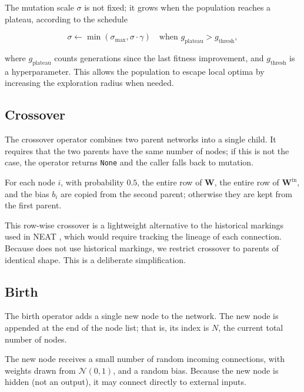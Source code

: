 The mutation scale $\sigma$ is not fixed; it grows when the population
reaches a plateau, according to the schedule

\begin{equation}
  \sigma \gets \min(\sigma_{\max}, \sigma \cdot \gamma)
  \quad \text{when } g_{\text{plateau}} > g_{\text{thresh}},
  \label{eq:method-sigma-adaptation}
\end{equation}

where $g_{\text{plateau}}$ counts generations since the last fitness
improvement, and $g_{\text{thresh}}$ is a hyperparameter. This allows
the population to escape local optima by increasing the exploration
radius when needed.

\subsection{Crossover}
\label{sec:method-crossover}

The crossover operator combines two parent networks into a single
child. It requires that the two parents have the same number of nodes;
if this is not the case, the operator returns \texttt{None} and the
caller falls back to mutation.

For each node $i$, with probability $0.5$, the entire row of
$\mathbf{W}$, the entire row of $\mathbf{W}^{\text{in}}$, and the bias
$b_i$ are copied from the second parent; otherwise they are kept from
the first parent.

This row-wise crossover is a lightweight alternative to the historical
markings used in NEAT \citep{stanley2002evolving}, which would require
tracking the lineage of each connection. Because \modnet{} does not use
historical markings, we restrict crossover to parents of identical
shape. This is a deliberate simplification.

\subsection{Birth}
\label{sec:method-birth}

The birth operator adds a single new node to the network. The new node
is appended at the end of the node list; that is, its index is $N$, the
current total number of nodes.

The new node receives a small number of random incoming connections,
with weights drawn from $\mathcal{N}(0, 1)$, and a random bias. Because
the new node is hidden (not an output), it may connect directly to
external inputs.

